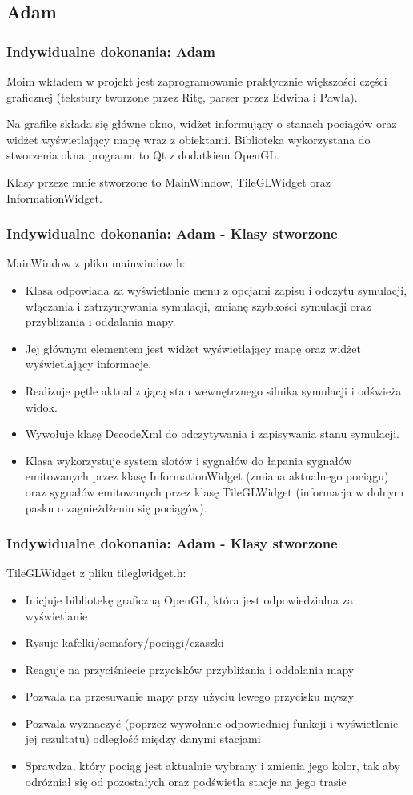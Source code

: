 \documentclass[a4paper, 11pt]{beamer}
\begin{document}
\subsection{Adam}
\begin{frame}
\frametitle{Indywidualne dokonania: Adam}
Moim wkładem w projekt jest zaprogramowanie praktycznie większości części graficznej (tekstury tworzone przez Ritę, parser przez Edwina i Pawła).

Na grafikę składa się główne okno, widżet informujący o stanach pociągów oraz widżet wyświetlający mapę wraz z obiektami. Biblioteka wykorzystana do stworzenia okna programu to Qt z dodatkiem OpenGL.

Klasy przeze mnie stworzone to MainWindow, TileGLWidget oraz InformationWidget.
\end{frame}
\begin{frame}
\frametitle{Indywidualne dokonania: Adam - Klasy stworzone}
MainWindow z pliku mainwindow.h:
\begin{itemize}
\item Klasa odpowiada za wyświetlanie menu z opcjami zapisu i odczytu symulacji, włączania i zatrzymywania symulacji, zmianę szybkości symulacji oraz przybliżania i oddalania mapy.
\item Jej głównym elementem jest widżet wyświetlający mapę oraz widżet wyświetlający informacje.
\item Realizuje pętle aktualizującą stan wewnętrznego silnika symulacji i odświeża widok.
\item Wywołuje klasę DecodeXml do odczytywania i zapisywania stanu symulacji.
\item Klasa wykorzystuje system slotów i sygnałów do łapania sygnałów emitowanych przez klasę InformationWidget (zmiana aktualnego pociągu) oraz sygnałów emitowanych przez klasę TileGLWidget (informacja w dolnym pasku o zagnieżdżeniu się pociągów).
\end{itemize}
\end{frame}
\begin{frame}
\frametitle{Indywidualne dokonania: Adam - Klasy stworzone}
TileGLWidget z pliku tileglwidget.h:
\begin{itemize}
\item Inicjuje bibliotekę graficzną OpenGL, która jest odpowiedzialna za wyświetlanie
\item Rysuje kafelki/semafory/pociągi/czaszki
\item Reaguje na przyciśniecie przycisków przybliżania i oddalania mapy
\item Pozwala na przesuwanie mapy przy użyciu lewego przycisku myszy
\item Pozwala wyznaczyć (poprzez wywołanie odpowiedniej funkcji i wyświetlenie jej rezultatu) odległość między danymi stacjami
\item Sprawdza, który pociąg jest aktualnie wybrany i zmienia jego kolor, tak aby odróżniał się od pozostałych oraz podświetla stacje na jego trasie
\end{itemize}
\end{frame}
\end{document}
